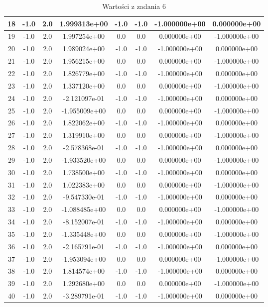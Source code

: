 \documentclass[12pt]{article}
\begin{document}
\begin{table}[!h]
\begin{tabular}{|c|c|c|c|c|c|c|c|}
\hline
18 & -1.0 & 2.0 & 1.999313e+00 & -1.0 & -1.0 & -1.000000e+00 & 0.000000e+00\\
\hline
19 & -1.0 & 2.0 & 1.997254e+00 & 0.0 & 0.0 & 0.000000e+00 & -1.000000e+00\\
\hline
20 & -1.0 & 2.0 & 1.989024e+00 & -1.0 & -1.0 & -1.000000e+00 & 0.000000e+00\\
\hline
21 & -1.0 & 2.0 & 1.956215e+00 & 0.0 & 0.0 & 0.000000e+00 & -1.000000e+00\\
\hline
22 & -1.0 & 2.0 & 1.826779e+00 & -1.0 & -1.0 & -1.000000e+00 & 0.000000e+00\\
\hline
23 & -1.0 & 2.0 & 1.337120e+00 & 0.0 & 0.0 & 0.000000e+00 & -1.000000e+00\\
\hline
24 & -1.0 & 2.0 & -2.121097e-01 & -1.0 & -1.0 & -1.000000e+00 & 0.000000e+00\\
\hline
25 & -1.0 & 2.0 & -1.955009e+00 & 0.0 & 0.0 & 0.000000e+00 & -1.000000e+00\\
\hline
26 & -1.0 & 2.0 & 1.822062e+00 & -1.0 & -1.0 & -1.000000e+00 & 0.000000e+00\\
\hline
27 & -1.0 & 2.0 & 1.319910e+00 & 0.0 & 0.0 & 0.000000e+00 & -1.000000e+00\\
\hline
28 & -1.0 & 2.0 & -2.578368e-01 & -1.0 & -1.0 & -1.000000e+00 & 0.000000e+00\\
\hline
29 & -1.0 & 2.0 & -1.933520e+00 & 0.0 & 0.0 & 0.000000e+00 & -1.000000e+00\\
\hline
30 & -1.0 & 2.0 & 1.738500e+00 & -1.0 & -1.0 & -1.000000e+00 & 0.000000e+00\\
\hline
31 & -1.0 & 2.0 & 1.022383e+00 & 0.0 & 0.0 & 0.000000e+00 & -1.000000e+00\\
\hline
32 & -1.0 & 2.0 & -9.547330e-01 & -1.0 & -1.0 & -1.000000e+00 & 0.000000e+00\\
\hline
33 & -1.0 & 2.0 & -1.088485e+00 & 0.0 & 0.0 & 0.000000e+00 & -1.000000e+00\\
\hline
34 & -1.0 & 2.0 & -8.152007e-01 & -1.0 & -1.0 & -1.000000e+00 & 0.000000e+00\\
\hline
35 & -1.0 & 2.0 & -1.335448e+00 & 0.0 & 0.0 & 0.000000e+00 & -1.000000e+00\\
\hline
36 & -1.0 & 2.0 & -2.165791e-01 & -1.0 & -1.0 & -1.000000e+00 & 0.000000e+00\\
\hline
37 & -1.0 & 2.0 & -1.953094e+00 & 0.0 & 0.0 & 0.000000e+00 & -1.000000e+00\\
\hline
38 & -1.0 & 2.0 & 1.814574e+00 & -1.0 & -1.0 & -1.000000e+00 & 0.000000e+00\\
\hline
39 & -1.0 & 2.0 & 1.292680e+00 & 0.0 & 0.0 & 0.000000e+00 & -1.000000e+00\\
\hline
40 & -1.0 & 2.0 & -3.289791e-01 & -1.0 & -1.0 & -1.000000e+00 & 0.000000e+00\\
\hline
    	    \end{tabular}
    \caption{Wartości z zadania 6}
\end{table}
\newpage
\end{document}

